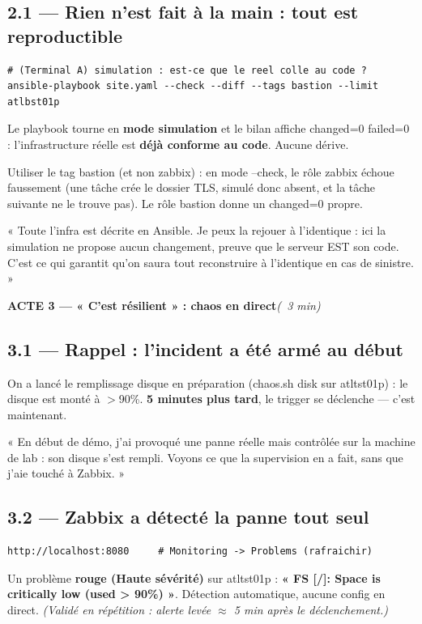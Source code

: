 \documentclass[11pt,a4paper]{article}
\newcommand{\acte}[2]{%
  \begin{tcolorbox}[enhanced,colback=atlasdark,colframe=atlasdark,coltext=white,
    sharp corners,boxrule=0pt,left=3mm,right=3mm,top=2mm,bottom=2mm,
    before skip=10pt,after skip=6pt]%
    {\bfseries\large #1}\dur{#2}%
  \end{tcolorbox}}
\newcommand{\cmd}[1]{{\ttfamily #1}}
\newcommand{\dur}[1]{\hfill{\small\color{codecom}\itshape (#1)}}
\begin{document}
\subsection*{2.1 — Rien n'est fait à la main : tout est reproductible}
\begin{lstlisting}[style=bash]
# (Terminal A) simulation : est-ce que le reel colle au code ?
ansible-playbook site.yaml --check --diff --tags bastion --limit atlbst01p
\end{lstlisting}
\begin{montrer}
Le playbook tourne en \textbf{mode simulation} et le bilan affiche
\cmd{changed=0  failed=0} : l'infrastructure réelle est \textbf{déjà conforme au code}.
Aucune dérive.
\end{montrer}
\begin{attention}
Utiliser le tag \cmd{bastion} (et non \cmd{zabbix}) : en mode \cmd{--check}, le rôle
\cmd{zabbix} échoue faussement (une tâche crée le dossier TLS, simulé donc absent, et la
tâche suivante ne le trouve pas). Le rôle \cmd{bastion} donne un \cmd{changed=0} propre.
\end{attention}
\begin{dire}
« Toute l'infra est décrite en Ansible. Je peux la rejouer à l'identique : ici la
simulation ne propose aucun changement, preuve que le serveur EST son code. C'est ce qui
garantit qu'on saura tout reconstruire à l'identique en cas de sinistre. »
\end{dire}

\acte{ACTE 3 — « C'est résilient » : chaos en direct}{~3 min}

\subsection*{3.1 — Rappel : l'incident a été armé au début}
On a lancé le remplissage disque en préparation (\cmd{chaos.sh disk} sur \cmd{atltst01p}) :
le disque est monté à $>$90\%. \textbf{5 minutes plus tard}, le trigger se déclenche — c'est
maintenant.
\begin{dire}
« En début de démo, j'ai provoqué une panne réelle mais contrôlée sur la machine de lab :
son disque s'est rempli. Voyons ce que la supervision en a fait, sans que j'aie touché à
Zabbix. »
\end{dire}

\subsection*{3.2 — Zabbix a détecté la panne tout seul}
\begin{lstlisting}[style=bash]
http://localhost:8080     # Monitoring -> Problems (rafraichir)
\end{lstlisting}
\begin{montrer}
Un problème \textbf{rouge (Haute sévérité)} sur \cmd{atltst01p} :
\textbf{« FS [/]: Space is critically low (used > 90\%) »}. Détection automatique, aucune
config en direct. \emph{(Validé en répétition : alerte levée $\approx$ 5 min après le
déclenchement.)}
\end{montrer}
\end{document}
